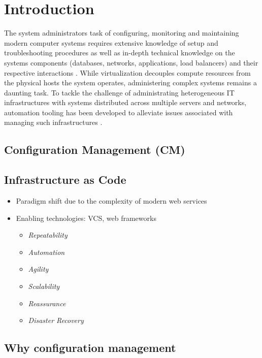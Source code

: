 \section{Introduction}

The system administrators task of configuring, monitoring and maintaining modern computer systems requires extensive knowledge of setup and troubleshooting procedures as well as in-depth technical knowledge on the systems components (databases, networks, applications, load balancers) and their respective interactions \cite{Barrett:2004:FSC:1031607.1031672}. While virtualization decouples compute resources from the physical hosts the system operates, administering complex systems remains a daunting task. To tackle the challenge of administrating heterogeneous IT infrastructures with systems distributed across multiple servers and networks, automation tooling has been developed to alleviate issues associated with managing such infrastructures \cite{Hintsch2016ARO}.

\subsection{Configuration Management (CM)}

\subsection{Infrastructure as Code}

\begin{itemize}
\item Paradigm shift due to the complexity of modern web services
\item Enabling technologies: VCS, web frameworks
\begin{itemize}
\item \textit{Repeatability}
\item \textit{Automation}
\item \textit{Agility}
\item \textit{Scalability}
\item \textit{Reassurance}
\item \textit{Disaster Recovery}
\end{itemize}
\end{itemize}

\subsection{Why configuration management}

